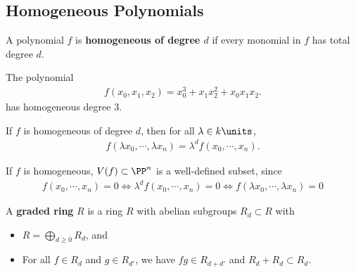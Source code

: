 \hypertarget{homogeneous-polynomials}{%
\subsection{Homogeneous Polynomials}\label{homogeneous-polynomials}}

\begin{definition}

A polynomial \(f\) is \textbf{homogeneous of degree \(d\)} if every
monomial in \(f\) has total degree \(d\).

\end{definition}

\begin{example}[?]

The polynomial
\begin{align*}  
f(x_0, x_1, x_2) = x_0^3 + x_1 x_2^2 + x_0 x_1 x_2
.\end{align*} has homogeneous degree 3.

\end{example}

\begin{remark}

If \(f\) is homogeneous of degree \(d\), then for all
\(\lambda \in k\units\),
\begin{align*}  
f(\lambda x_0, \cdots, \lambda x_n) = \lambda^d f(x_0, \cdots, x_n)
.\end{align*}

If \(f\) is homogeneous, \(V(f) \subset \PP^n\) is a well-defined
subset, since
\begin{align*}
f(x_0, \cdots, x_n) = 0 \iff \lambda^d f(x_0, \cdots, x_n) = 0 \iff f(\lambda x_0, \cdots, \lambda x_n) = 0
\end{align*}

\end{remark}

\begin{definition}

A \textbf{graded ring} \(R\) is a ring \(R\) with abelian subgroups
\(R_d \subset R\) with

\begin{itemize}
\tightlist
\item
  \(R = \bigoplus_{d\geq 0} R_d\), and
\item
  For all \(f\in R_d\) and \(g\in R_{d'}\), we have \(fg \in R_{d+d'}\)
  and \(R_d + R_{d} \subset R_d\).
\end{itemize}

\end{definition}

